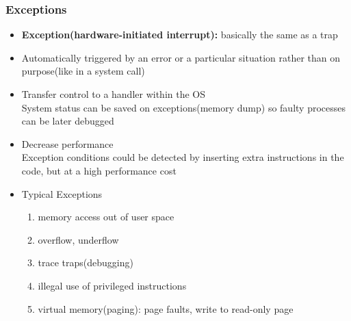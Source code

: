 \documentclass[11pt]{article}
\theoremstyle{definition}
\begin{document}
        \subsubsection{Exceptions}
            \begin{itemize}
                \item \textbf{Exception(hardware-initiated interrupt):} basically the same as a trap
                \item Automatically triggered by an error or a particular situation rather than on purpose(like in a system call)
                \item Transfer control to a handler within the OS \\ \hspace{1cm} System status can be saved on exceptions(memory dump) so faulty processes can be later debugged
                \item Decrease performance
                \\ \hspace{1cm} Exception conditions could be detected by inserting extra instructions in the code, but at a high performance cost
                \item Typical Exceptions
                    \begin{enumerate}
                        \item memory access out of user space
                        \item overflow, underflow
                        \item trace traps(debugging)
                        \item illegal use of privileged instructions
                        \item virtual memory(paging): page faults, write to read-only page
                    \end{enumerate}
            \end{itemize}
        \clearpage
\end{document}
